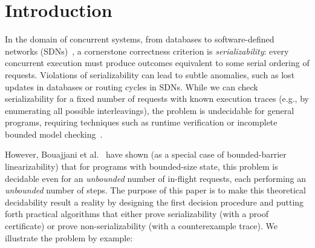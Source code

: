 \section{Introduction}
\label{sec:introduction}

In the domain of concurrent systems, from databases to software-defined networks (SDNs)~\cite{KrRaVePaRoAzUh14,XiWeFoNiXi15}, a cornerstone correctness criterion is \emph{serializability}: every concurrent execution must produce outcomes equivalent to some serial ordering of requests. Violations of serializability can lead to subtle anomalies, such as lost updates in databases or routing cycles in SDNs.
While we can check serializability for a fixed number of requests with known execution traces (e.g., by enumerating all possible interleavings), the problem is undecidable for general programs, requiring techniques such as runtime verification or incomplete bounded model checking~\cite{WaSt06a,WaSt06b,FlFrYi08,FaMa08,SiMaWaGu11a,SiMaWaGu11b,Pa79,AlMcPe96,BiEn19}.

However, Bouajjani et al.~\cite{BoEmEnHa13} have shown (as a special case of bounded-barrier linearizability) that for programs with bounded-size state, this problem is decidable even for an \emph{unbounded} number of in-flight requests, each performing an \emph{unbounded} number of steps. The purpose of this paper is to make this theoretical decidability result a reality by designing the first decision procedure and putting forth practical algorithms that either prove serializability (with a proof certificate) or prove non-serializability (with a counterexample trace).
% 
We illustrate the problem by example:


